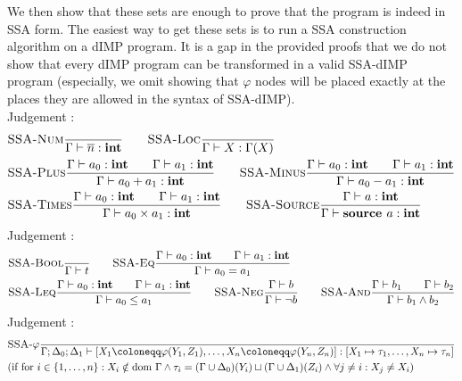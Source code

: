 We then show that these sets are enough to prove that the program is indeed in SSA form.
The easiest way to get these sets is to run a SSA construction algorithm on a dIMP program.
It is a gap in the provided proofs that we do not show that every dIMP program
can be transformed in a valid SSA-dIMP program (especially, we omit showing that
$\varphi$ nodes will be placed exactly at the places they are allowed in the syntax
of SSA-dIMP).
\\
Judgement :
\begin{align*}
    &\textsc{SSA-Num}\frac{\displaystyle }{\displaystyle \Gamma \vdash {\overline{n}}: \textbf{int}}\qquad
    \textsc{SSA-Loc}\frac{\displaystyle }{\displaystyle \Gamma \vdash {X}: \Gamma(X)}\\
    &\textsc{SSA-Plus}\frac{\displaystyle \Gamma \vdash {a_0}: \textbf{int}\qquad\Gamma \vdash {a_1}: \textbf{int}}{\displaystyle \Gamma \vdash {a_0+a_1}: \textbf{int}}\qquad
    \textsc{SSA-Minus}\frac{\displaystyle \Gamma \vdash {a_0}: \textbf{int}\qquad\Gamma \vdash {a_1}: \textbf{int}}{\displaystyle \Gamma \vdash {a_0-a_1}: \textbf{int}}\\
    &\textsc{SSA-Times}\frac{\displaystyle \Gamma \vdash {a_0}: \textbf{int}\qquad\Gamma \vdash {a_1}: \textbf{int}}{\displaystyle \Gamma \vdash {a_0 \times a_1}: \textbf{int}}\qquad
    \textsc{SSA-Source}\frac{\displaystyle \Gamma \vdash {a}: \textbf{int}}{\displaystyle \Gamma \vdash {\textbf{source }{a}}: \textbf{int}}\\
\end{align*}
Judgement :
\begin{align*}
    &\textsc{SSA-Bool}\frac{\displaystyle }{\displaystyle \Gamma \vdash {t}}\qquad
    \textsc{SSA-Eq}\frac{\displaystyle \Gamma \vdash {a_0}: \textbf{int}\qquad \Gamma \vdash {a_1}: \textbf{int}}{\displaystyle \Gamma \vdash {a_0 = a_1}}\\
    &\textsc{SSA-Leq}\frac{\displaystyle \Gamma \vdash {a_0}: \textbf{int}\qquad \Gamma \vdash {a_1}: \textbf{int}}{\displaystyle \Gamma \vdash {a_0 \leq a_1}}\qquad
    \textsc{SSA-Neg}\frac{\displaystyle \Gamma \vdash {b}}{\displaystyle \Gamma \vdash {\neg b}}\qquad
    \textsc{SSA-And}\frac{\displaystyle \Gamma \vdash {b_1}\qquad\Gamma \vdash {b_2}}{\displaystyle \Gamma \vdash {b_1 \land b_2}}\\
\end{align*}
Judgement :
\begin{align*}
    &\trule{SSA-$\varphi$}{}{\typestep{\Gamma;\Delta_0;\Delta_1}{\defaultphilistn}{[X_1 \mapsto \type_1, \ldots, X_n \mapsto \type_n]}}\\
    &\text{(if for $i \in \{1, \ldots, n\}: X_i \notin \dom\Gamma \land \type_i = (\Gamma \cup \Delta_0)(Y_i) \join (\Gamma \cup \Delta_1)(Z_i)
    \land \forall j \neq i: X_j \neq X_i$)}
\end{align*}
